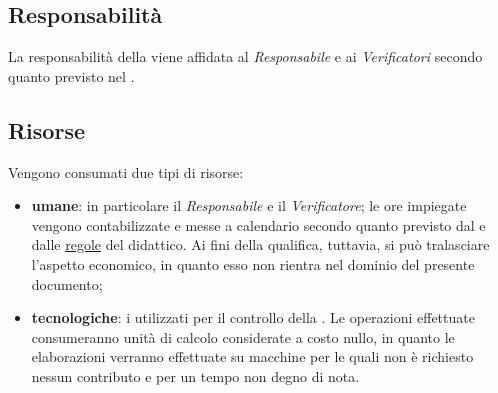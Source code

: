 \subsection{Responsabilità}
La responsabilità della  viene affidata al \textit{Responsabile} e ai \textit{Verificatori} secondo quanto previsto nel \PianoDiProgetto.

\subsection{Risorse}
Vengono consumati due tipi di risorse:
\begin{itemize}
	\item \textbf{umane}: in particolare il \textit{Responsabile} e il \textit{Verificatore}; le ore impiegate vengono contabilizzate e messe a calendario secondo quanto previsto dal \PianoDiProgetto e dalle \href{http://www.math.unipd.it/~tullio/IS-1/2015/Dispense/PD01.pdf}{regole} del  didattico. Ai fini della qualifica, tuttavia, si può tralasciare l'aspetto economico, in quanto esso non rientra nel dominio del presente documento;
		\item \textbf{tecnologiche}: i  utilizzati per il controllo della . Le operazioni effettuate  consumeranno unità di calcolo considerate a costo nullo, in quanto le elaborazioni verranno effettuate su macchine per le quali non è richiesto nessun contributo e per un tempo non degno di nota.
\end{itemize}
